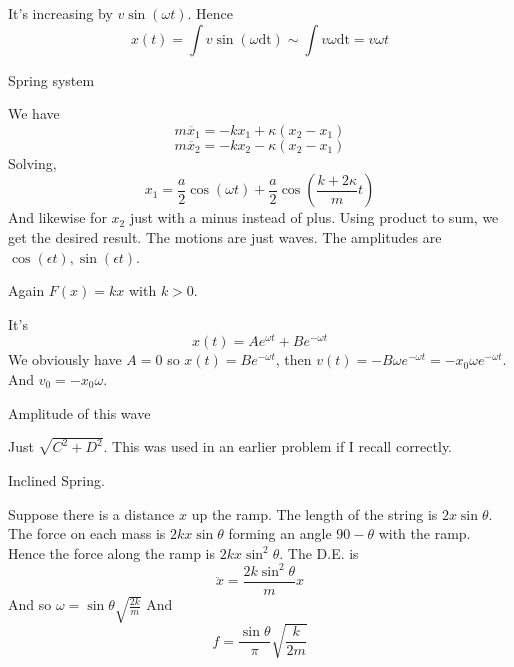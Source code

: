 \documentclass[11pt]{scrartcl}
\newcommand{\ca}[1]{\mathrm{#1}}
\begin{document}
\begin{soln}
  It's increasing by $v\sin(\omega t)$. Hence
  $$x(t)=\int v\sin(\omega \ca{dt})\sim \int v \omega \ca {dt}=v\omega t$$
\end{soln}
\begin{example}
  [4.9]
\end{example}
\begin{soln}
\end{soln}
\begin{example}
  [4.10]
  Spring system
\end{example}
\begin{soln}
  We have
  $$m\ddot{x_1}=-kx_1+\kappa(x_2-x_1)$$
  $$m\ddot{x_2}=-kx_2-\kappa(x_2-x_1)$$
  Solving,
  $$x_1=\frac{a}{2}\cos(\omega t)+\frac{a}{2}\cos\left(\frac{k+2\kappa}{m}t\right)$$
  And likewise for $x_2$ just with a minus instead of plus. Using product to sum,
  we get the desired result. The motions are just waves. The amplitudes are $\cos(\epsilon t),\sin(\epsilon t)$.
\end{soln}
\begin{example}
  [4.13]
  Again $F(x)=kx$ with $k>0$.
\end{example}
\begin{soln}
  It's
  $$x(t)=Ae^{\omega t}+Be^{-\omega t}$$
  We obviously have $A=0$ so $x(t)=Be^{-\omega t}$, then
  $v(t)=-B\omega e^{-\omega t}=-x_0\omega e^{-\omega t}$. And $v_0=-x_0\omega$.
\end{soln}
\begin{example}
  [4.14]
\end{example}
\begin{soln}
\end{soln}
\begin{example}
  [4.15]
  Amplitude of this wave
\end{example}
\begin{soln}
  Just $\sqrt{C^2+D^2}$. This was used in an earlier problem if I recall correctly.
\end{soln}
\begin{example}
  [4.16]
  Inclined Spring.
\end{example}
\begin{soln}
  Suppose there is a distance $x$ up the ramp. The length of the string is
  $2x\sin\theta$. The force on each mass is $2kx\sin\theta$ forming an angle
  $90-\theta$ with the ramp. Hence the force along the ramp is $2kx\sin^2\theta$.
  The D.E. is
  $$\ddot{x}=\frac{2k\sin^2\theta}{m}x$$
  And so $\omega=\sin\theta \sqrt{\frac{2k}{m}}$
  And $$f=\frac{\sin\theta}{\pi}\sqrt{\frac{k}{2m}}$$
\end{soln}
\end{document}
